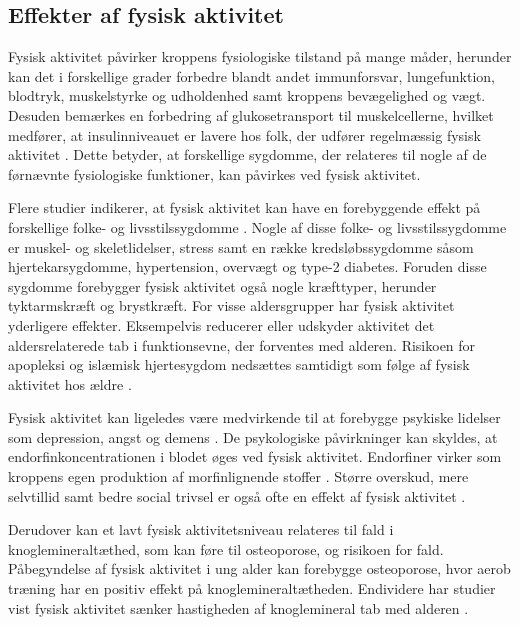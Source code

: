 \subsection{Effekter af fysisk aktivitet}\label{sec:effekterafaktivitet}
Fysisk aktivitet påvirker kroppens fysiologiske tilstand på mange måder, herunder kan det i forskellige grader forbedre blandt andet immunforsvar, lungefunktion, blodtryk, muskelstyrke og udholdenhed samt kroppens bevægelighed og vægt. Desuden bemærkes en forbedring af glukosetransport til muskelcellerne, hvilket medfører, at insulinniveauet er lavere hos folk, der udfører regelmæssig fysisk aktivitet \citep{andersen2001, martini2015}. Dette betyder, at forskellige sygdomme, der relateres til nogle af de førnævnte fysiologiske funktioner, kan påvirkes ved fysisk aktivitet.

Flere studier indikerer, at fysisk aktivitet kan have en forebyggende effekt på forskellige folke- og livsstilssygdomme \citep{warburton2010}. Nogle af disse folke- og livsstilssygdomme er muskel- og skeletlidelser, stress samt en række kredsløbssygdomme såsom hjertekarsygdomme, hypertension, overvægt og type-2 diabetes. Foruden disse sygdomme forebygger fysisk aktivitet også nogle kræfttyper, herunder tyktarmskræft og brystkræft. For visse aldersgrupper har fysisk aktivitet yderligere effekter. Eksempelvis reducerer eller udskyder aktivitet det aldersrelaterede tab i funktionsevne, der forventes med alderen. Risikoen for apopleksi og islæmisk hjertesygdom nedsættes samtidigt som følge af fysisk aktivitet hos ældre \citep{pedersen2011,
warburton2010}. 

Fysisk aktivitet kan ligeledes være medvirkende til at forebygge psykiske lidelser som depression, angst og demens \citep{pedersen2011}. De psykologiske påvirkninger kan skyldes, at endorfinkoncentrationen i blodet øges ved fysisk aktivitet. Endorfiner virker som kroppens egen produktion af morfinlignende stoffer \citep{kessing2016}. Større overskud, mere selvtillid samt bedre social trivsel er også ofte en effekt af fysisk aktivitet \citep{sundhedsstyrelsen2006}. 


Derudover kan et lavt fysisk aktivitetsniveau relateres til fald i knoglemineraltæthed, som kan føre til osteoporose, og risikoen for fald. Påbegyndelse af fysisk aktivitet i ung alder kan forebygge osteoporose, hvor aerob træning har en positiv effekt på knoglemineraltætheden. Endividere har studier vist fysisk aktivitet sænker hastigheden af knoglemineral tab med alderen \citep{sundhedsstyrelsen2006}. 


